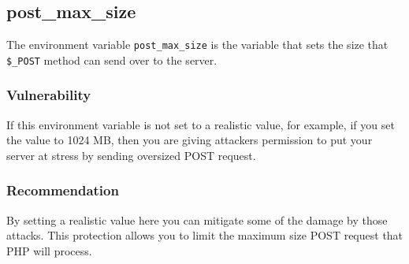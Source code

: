 \documentclass[conference]{IEEEtran}
\begin{document}
\subsection{post\_max\_size}
The environment variable \texttt{post\_max\_size} is the variable that sets the size that \texttt{\$\_POST} method can send over to the server.
\subsubsection{Vulnerability}
If this environment variable is not set to a realistic value, for example, if you set the value to 1024 MB, then you are giving attackers permission to put your server at stress by sending oversized POST request.\cite{postmaxsize}
\subsubsection{Recommendation}
By setting a realistic value here you can mitigate some of the damage by those attacks. This protection allows you to limit the maximum size POST request that PHP will process.



\end{document}
